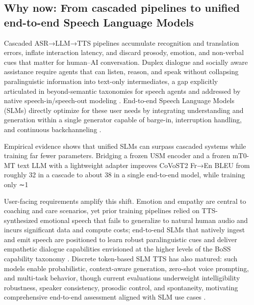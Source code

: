\documentclass{article}
\begin{document}

\subsection{Why now: From cascaded pipelines to unified end-to-end Speech Language Models} \label{subsec:Why now: From cascaded pipelines to unified end-to-end Speech Language Models}

Cascaded ASR→LLM→TTS pipelines accumulate recognition and translation errors, inflate interaction latency, and discard prosody, emotion, and non-verbal cues that matter for human–AI conversation. Duplex dialogue and socially aware assistance require agents that can listen, reason, and speak without collapsing paralinguistic information into text-only intermediates, a gap explicitly articulated in beyond-semantic taxonomies for speech agents and addressed by native speech-in/speech-out modeling . End-to-end Speech Language Models (SLMs) directly optimize for these user needs by integrating understanding and generation within a single generator capable of barge-in, interruption handling, and continuous backchanneling \cite{ma2024languagemodelcanlistenwhilespeaking}.



Empirical evidence shows that unified SLMs can surpass cascaded systems while training far fewer parameters. Bridging a frozen USM encoder and a frozen mT0-MT text LLM with a lightweight adapter improves CoVoST2 Fr→En BLEU from roughly 32 in a cascade to about 38 in a single end-to-end model, while training only ∼1%



User-facing requirements amplify this shift. Emotion and empathy are central to coaching and care scenarios, yet prior training pipelines relied on TTS-synthesized emotional speech that fails to generalize to natural human audio and incurs significant data and compute costs; end-to-end SLMs that natively ingest and emit speech are positioned to learn robust paralinguistic cues and deliver empathetic dialogue capabilities envisioned at the higher levels of the BoSS capability taxonomy . Discrete token-based SLM TTS has also matured: such models enable probabilistic, context-aware generation, zero-shot voice prompting, and multi-task behavior, though current evaluations underweight intelligibility robustness, speaker consistency, prosodic control, and spontaneity, motivating comprehensive end-to-end assessment aligned with SLM use cases \cite{wang2024evaluatingtextspeechsynthesislargediscre}.
\end{document}
